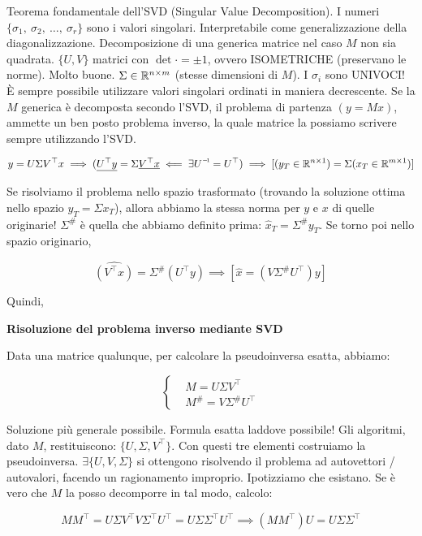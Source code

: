 Teorema fondamentale dell'SVD (Singular Value Decomposition). I numeri $\{\sigma_1,\ \sigma_2,\ \dots,\ \sigma_r\}$ sono i valori singolari. Interpretabile come generalizzazione della diagonalizzazione. Decomposizione di una generica matrice nel caso $M$ non sia quadrata. $\{U,V\}$ matrici con $\det{\mathord{\cdot}}=\pm 1$, ovvero ISOMETRICHE (preservano le norme). Molto buone. $\Sigma\in\mathbb{R}^{n\times m}$ (stesse dimensioni di $M$). I $\sigma_i$ sono UNIVOCI! \`E sempre possibile utilizzare valori singolari ordinati in maniera decrescente. Se la $M$ generica è decomposta secondo l'SVD, il problema di partenza $(y=Mx)$, ammette un ben posto problema inverso, la quale matrice la possiamo scrivere sempre utilizzando l'SVD.

\[
	y=U\Sigma V^\top x \implies (\underline{U^\top y} = \Sigma \underline{V^\top x} \impliedby\exists\inv{U}=U^\top) \implies [(y_T\in\R^{n\times 1}) = \Sigma (x_T\in\R^{m\times 1})]
\]

Se risolviamo il problema nello spazio trasformato (trovando la soluzione ottima nello spazio $y_T=\Sigma x_T$), allora abbiamo la stessa norma per $y$ e $x$ di quelle originarie! $\Sigma^\#$ è quella che abbiamo definito prima: $\hat{x}_T = \Sigma^\# y_T$. Se torno poi nello spazio originario, 

\[
	\hat{(V^\top x)} = \Sigma^\#(U^\top y) \implies [\hat{x}=(V\Sigma^\# U^\top)y]
\]

Quindi,

\begin{corl}{\textbf{Risoluzione del problema inverso mediante SVD}}

Data una matrice qualunque, per calcolare la pseudoinversa esatta, abbiamo:

\[
	\left\{
	\begin{aligned}
	&M=U\Sigma V^\top\\
	&M^\# = V\Sigma^\# U^\top
	\end{aligned}
	\right.
\]

\end{corl}

Soluzione più generale possibile. Formula esatta laddove possibile! Gli algoritmi, dato $M$, restituiscono: $\{U,\Sigma,V^\top\}$. Con questi tre elementi costruiamo la pseudoinversa. $\exists\{U,V,\Sigma\}$ si ottengono risolvendo il problema ad autovettori / autovalori, facendo un ragionamento improprio. Ipotizziamo che esistano. Se è vero che $M$ la posso decomporre in tal modo, calcolo:

\[	
	MM^\top = U\Sigma V^\top V\Sigma^\top U^\top = U\Sigma\Sigma^\top U^\top \implies (MM^\top)U = U\Sigma\Sigma^\top
\]

